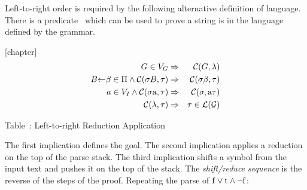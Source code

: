 \begin{enumerate}
Left-to-right order is required by the following 
alternative definition of language.  
There is a predicate \sform\ which can be used to prove a string is
in the language defined by the grammar.

{}[chapter]
\setcounter{reductions}{\value{table}}
\begin{eqnarray*}
  G \in V_G &\Rightarrow& {\mbox{$\cal C$}}(G, \lambda)                \\
  B\mbox{$\leftarrow$}\beta \in \Pi \wedge {\mbox{$\cal C$}}(\sigma B, \tau) 
      &\Rightarrow& {\mbox{$\cal C$}}(\sigma\beta, \tau)               \\
  a \in V_I \wedge {\mbox{$\cal C$}}(\sigma {\rm a}, \tau)
      &\Rightarrow& {\mbox{$\cal C$}}(\sigma, {\rm a}\tau)             \\
  {\mbox{$\cal C$}}(\lambda, \tau) &\Rightarrow& \tau \in \cal L(G)
\end{eqnarray*}
\begin{center}
Table~\thetable: Left-to-right Reduction Application
\end{center}

The first implication defines the goal.  
The second implication applies a reduction on the top of the parse stack.  
The third implication shifts a symbol 
from the input text and pushes it on the top of the stack.  
The {\em shift/reduce sequence} is the reverse of the steps of the proof.  
Repeating the parse of ${\rm f}\vee{\rm t}\wedge\neg{\rm f}$:


\end{enumerate}
